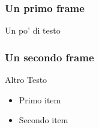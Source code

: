 \documentclass{beamer}
\begin{document}
\begin{frame}
    \frametitle{Un primo frame}
    Un po' di testo
\end{frame}

\begin{frame}
    \frametitle{Un secondo frame}
    Altro Testo
    \begin{itemize}
        \item<1-> Primo item
        \item<2-> Secondo item
    \end{itemize}
\end{frame}
\end{document}
